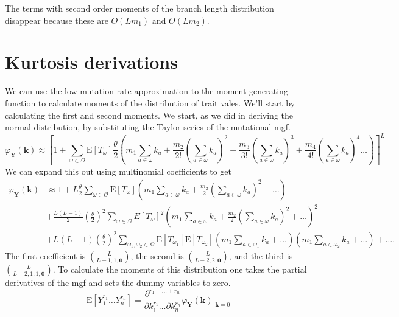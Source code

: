 \documentclass{article}
\newcommand{\T}{\frac{\theta}{2}}
\newcommand{\E}{\mathrm{E}}
\begin{document}
The terms with second order moments of the branch length distribution disappear
because these are $O(Lm_1)$ and $O(Lm_2)$. 
\section{Kurtosis derivations}
\label{kurt}
We can use the low mutation rate approximation to the moment generating function
to calculate moments of the distribution of trait vales. We'll start by
calculating the first and second moments. We start, as we did in deriving the
normal distribution, by substituting the Taylor series of the mutational mgf.
\begin{equation}
  \label{eq:mgf_approx_sub}
  \varphi_{\mathbf{Y}}(\mathbf{k}) \approx \left[ 1 + \sum_{\omega \in \Omega}
    \E[T_\omega] \T \left( m_1 \sum_{a \in \omega} k_a +
    \frac{m_2}{2!}\left( \sum_{a \in \omega} k_a\right)^2 +
    \frac{m_3}{3!}\left( \sum_{a \in \omega} k_a\right)^3 +
    \frac{m_4}{4!}\left( \sum_{a \in \omega} k_a\right)^4 \ldots \right) \right]^L
\end{equation}
We can expand this out using multinomial coefficients to get
\begin{align}
  \label{eq:mgf_approx_expand}
  \varphi_{\mathbf{Y}}(\mathbf{k}) &\approx 1 +
  L\T \sum_{\omega \in \mathcal{O}} \E[T_{\omega}]\left( m_1 \sum_{a \in \omega} k_a +
  \frac{m_2}{2}\left( \sum_{a \in \omega} k_a\right)^2 + \ldots \right) \nonumber \\
  &+ \frac{L(L-1)}{2} \left(\T\right)^2 \sum_{\omega \in \Omega} E[T_{\omega}]^2
  \left( m_1 \sum_{a \in \omega} k_a +
  \frac{m_2}{2}\left( \sum_{a \in \omega} k_a\right)^2 + \ldots \right)^2 \nonumber \\
  &+ L(L-1)\left(\T\right)^2\sum_{\omega_1, \omega_2 \in \Omega}\E[T_{\omega_1}]\E[T_{\omega_2}]
  \left( m_1 \sum_{a \in \omega_1} k_a + \ldots \right)
  \left( m_1 \sum_{a \in \omega_2} k_a + \ldots \right) + \ldots.
\end{align}
The first coefficient is $\binom{L}{L-1,1,\mathbf{0}}$, the second is
$\binom{L}{L-2,2,\mathbf{0}}$, and the third is $\binom{L}{L-2,1,1,\mathbf{0}}$.
To calculate the moments of this distribution one takes the partial derivatives
of the mgf and sets the dummy variables to zero.
\begin{equation}
  \label{eq:deriv}
  \E[Y_1^{r_1}\ldots Y_n^{r_n}] = \frac{\partial^{r_1 + \ldots + r_n}}{\partial k_1^{r_1} \ldots \partial k_n^{r_n}}
  \varphi_{\mathbf{Y}}(\mathbf{k})\Bigr|_{\mathbf{k}=0}
\end{equation}
\end{document}
